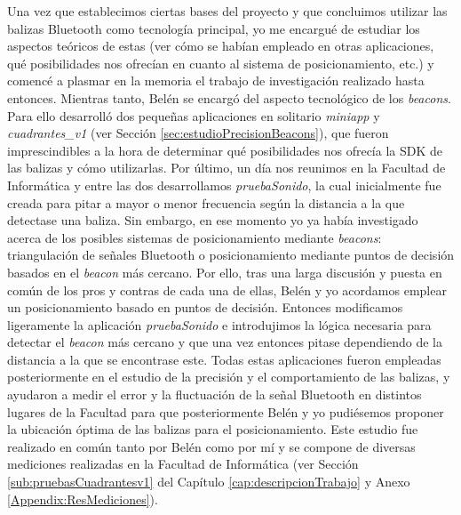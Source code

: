 Una vez que establecimos ciertas bases del proyecto y que concluimos utilizar las balizas Bluetooth como tecnología principal, yo me encargué de estudiar los aspectos teóricos de estas (ver cómo se habían empleado en otras aplicaciones, qué posibilidades nos ofrecían en cuanto al sistema de posicionamiento, etc.) y comencé a plasmar en la memoria el trabajo de investigación realizado hasta entonces. Mientras tanto, Belén se encargó del aspecto tecnológico de los \textit{beacons}. Para ello desarrolló dos pequeñas aplicaciones en solitario \textit{miniapp} y \textit{cuadrantes\_v1} (ver Sección \ref{sec:estudioPrecisionBeacons}), que fueron imprescindibles a la hora de determinar qué posibilidades nos ofrecía la SDK de las balizas y cómo utilizarlas. Por último, un día nos reunimos en la Facultad de Informática y entre las dos desarrollamos \textit{pruebaSonido}, la cual inicialmente fue creada para pitar a mayor o menor frecuencia según la distancia a la que detectase una baliza. Sin embargo, en ese momento yo ya había investigado acerca de los posibles sistemas de posicionamiento mediante \textit{beacons}: triangulación de señales Bluetooth o posicionamiento mediante puntos de decisión basados en el \textit{beacon} más cercano. Por ello, tras una larga discusión y puesta en común de los pros y contras de cada una de ellas, Belén y yo acordamos emplear un posicionamiento basado en puntos de decisión. Entonces modificamos ligeramente la aplicación \textit{pruebaSonido} e introdujimos la lógica necesaria para detectar el \textit{beacon} más cercano y que una vez entonces pitase dependiendo de la distancia a la que se encontrase este. Todas estas aplicaciones fueron empleadas posteriormente en el estudio de la precisión y el comportamiento de las balizas, y ayudaron a medir el error y la fluctuación de la señal Bluetooth en distintos lugares de la Facultad para que posteriormente Belén y yo pudiésemos proponer la ubicación óptima de las balizas para el posicionamiento. Este estudio fue realizado en común tanto por Belén como por mí y se compone de diversas mediciones realizadas en la Facultad de Informática (ver Sección \ref{sub:pruebasCuadrantesv1} del Capítulo \ref{cap:descripcionTrabajo} y Anexo \ref{Appendix:ResMediciones}). 

